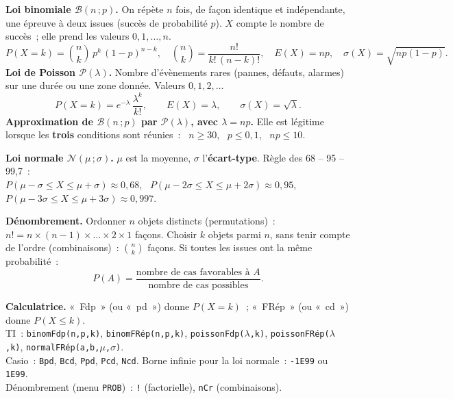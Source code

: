 \documentclass[a4paper,11pt]{article}
\begin{document}
\begin{rappel}
\textbf{Loi binomiale $\mathcal{B}(n\,;p)$.} On répète $n$ fois, de façon identique et indépendante, une épreuve à deux issues (succès de probabilité $p$). $X$ compte le nombre de succès~; elle prend les valeurs $0, 1, \dots, n$.
\[
P(X = k) = \binom{n}{k}\,p^{k}\,(1-p)^{n-k},\quad \binom{n}{k} = \frac{n!}{k!\,(n-k)!},\quad E(X) = np,\quad \sigma(X) = \sqrt{np(1-p)}.
\]
\textbf{Loi de Poisson $\mathcal{P}(\lambda)$.} Nombre d'évènements rares (pannes, défauts, alarmes) sur une durée ou une zone donnée. Valeurs $0, 1, 2, \dots$
\[
P(X = k) = e^{-\lambda}\,\frac{\lambda^{k}}{k!},\qquad E(X) = \lambda,\qquad \sigma(X) = \sqrt{\lambda}.
\]
\textbf{Approximation de $\mathcal{B}(n\,;p)$ par $\mathcal{P}(\lambda)$, avec $\lambda = np$.} Elle est légitime lorsque les \textbf{trois} conditions sont réunies~: \ $n \geq 30$, \ $p \leq 0{,}1$, \ $np \leq 10$.

\smallskip
\textbf{Loi normale $\mathcal{N}(\mu\,;\sigma)$.} $\mu$ est la moyenne, $\sigma$ l'\textbf{écart-type}. Règle des 68 -- 95 -- 99,7~:\\
$P(\mu-\sigma\leq X\leq\mu+\sigma)\approx 0{,}68$, \ $P(\mu-2\sigma\leq X\leq\mu+2\sigma)\approx 0{,}95$, \ $P(\mu-3\sigma\leq X\leq\mu+3\sigma)\approx 0{,}997$.

\smallskip
\textbf{Dénombrement.} Ordonner $n$ objets distincts (permutations)~: $n! = n\times(n-1)\times\dots\times 2\times 1$ façons. Choisir $k$ objets parmi $n$, sans tenir compte de l'ordre (combinaisons)~: $\binom{n}{k}$ façons. Si toutes les issues ont la même probabilité~:
\[
P(A) = \frac{\text{nombre de cas favorables à } A}{\text{nombre de cas possibles}}.
\]

\smallskip
\textbf{Calculatrice.} «~Fdp~» (ou «~pd~») donne $P(X = k)$~; «~FRép~» (ou «~cd~») donne $P(X \leq k)$.\\
{\small TI~: \texttt{binomFdp(n,p,k)}, \texttt{binomFRép(n,p,k)}, \texttt{poissonFdp($\lambda$,k)}, \texttt{poissonFRép($\lambda$,k)}, \texttt{normalFRép(a,b,$\mu$,$\sigma$)}.\\
Casio~: \texttt{Bpd}, \texttt{Bcd}, \texttt{Ppd}, \texttt{Pcd}, \texttt{Ncd}. \quad Borne infinie pour la loi normale~: \texttt{-1E99} ou \texttt{1E99}.\\
Dénombrement (menu \texttt{PROB})~: \texttt{!} (factorielle), \texttt{nCr} (combinaisons).}
\end{rappel}

\newpage
\end{document}
